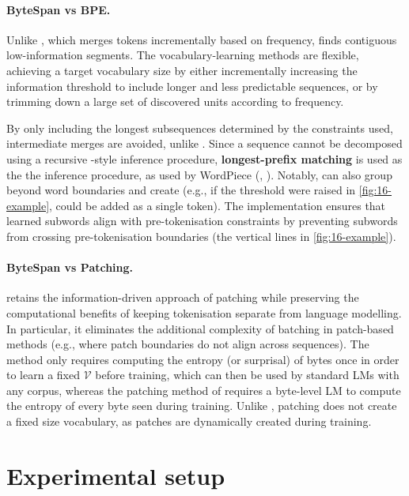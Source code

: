 \paragraph{ByteSpan vs BPE.}

Unlike \bpe, which merges tokens incrementally based on frequency, \bytespan finds contiguous low-information segments. The vocabulary-learning methods are flexible, achieving a target vocabulary size by either incrementally increasing the information threshold to include longer and less predictable sequences, or by trimming down a large set of discovered units according to frequency.

By only including the longest subsequences determined by the constraints used, intermediate merges are avoided, unlike \bpe. Since a sequence cannot be decomposed using a recursive \bpe-style inference procedure, \textbf{longest-prefix matching} is used as the the inference procedure, as used by WordPiece (\wordpiece, \citealp{schuster-nakajima-2012-voice}). Notably, \bytespan can also group beyond word boundaries and create  (e.g., if the threshold were raised in \cref{fig:16-example},  could be added as a single token). The implementation ensures that learned subwords align with \bpe pre-tokenisation constraints by preventing subwords from crossing pre-tokenisation boundaries (the vertical lines in \cref{fig:16-example}).

\paragraph{ByteSpan vs Patching.}
\bytespan retains the information-driven approach of patching while preserving the computational benefits of keeping tokenisation separate from language modelling. In particular, it eliminates the additional complexity of batching in patch-based methods (e.g., where patch boundaries do not align across sequences). The method only requires computing the entropy (or surprisal) of bytes once in order to learn a fixed \(\mathcal{V}\) before training, which can then be used by standard LMs with any corpus, whereas the patching method of \citet{pagnoni2024byte} requires a byte-level LM to compute the entropy of every byte seen during training. Unlike \bytespan, patching does not create a fixed size vocabulary, as patches are dynamically created during training.

\section{Experimental setup}\label{sec:16-setup}

